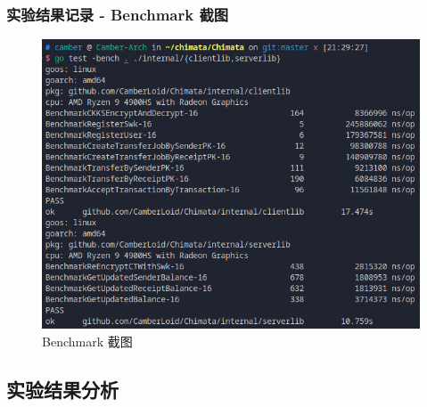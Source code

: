 \begin{frame}
    \frametitle{实验结果记录 - Benchmark 截图}

    \begin{figure}
        \centering
        \includegraphics[width=0.8\linewidth]{figures/Bench_Overall.png}
        \caption{Benchmark 截图}
    \end{figure}

\end{frame}

\subsection{实验结果分析}
 
